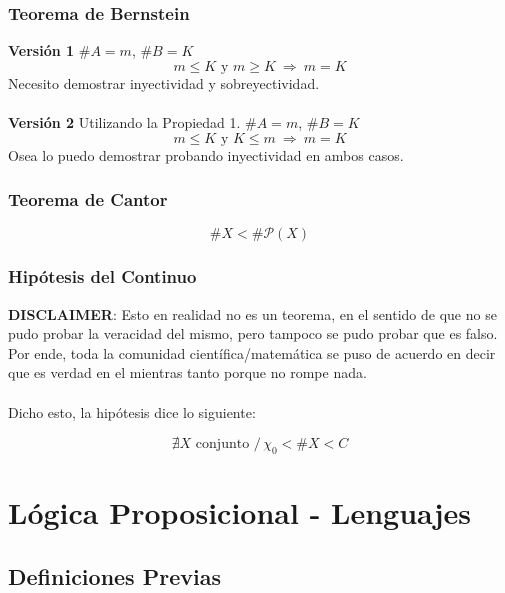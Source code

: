 \documentclass{article}
\newcommand{\tq}{/\,}                                   %
\newcommand{\partes}{\mathcal{P}}
\newcommand{\Rightarrows}{\: \Rightarrow \:}            %
\begin{document}
\subsubsection{Teorema de Bernstein}
\textbf{Versión 1}
$\#A = m$, $\#B = K$
\begin{equation*}
    m \leq K \text{ y } m \geq K \Rightarrows m = K
\end{equation*}
Necesito demostrar inyectividad y sobreyectividad.
\\\\
\textbf{Versión 2}
\newline Utilizando la Propiedad 1.
\newline $\#A = m$, $\#B = K$
\begin{equation*}
    m \leq K \text{ y } K \leq m \Rightarrows m = K
\end{equation*}
Osea lo puedo demostrar probando inyectividad en ambos casos.

\subsubsection{Teorema de Cantor}
\begin{equation*}
    \#X < \#\partes(X)
\end{equation*}

\subsubsection{Hipótesis del Continuo}
\textbf{DISCLAIMER}: Esto en realidad no es un teorema, en el sentido de que no se pudo probar la veracidad del mismo, pero tampoco se pudo probar que es falso. Por ende, toda la comunidad científica/matemática se puso de acuerdo en decir que es verdad en el mientras tanto porque no rompe nada.
\\\\Dicho esto, la hipótesis dice lo siguiente:

\begin{equation*}
    \nexists X \text{ conjunto } \tq \chi_0 < \#X < C
\end{equation*} 

\newpage
\section{Lógica Proposicional - Lenguajes}
\subsection{Definiciones Previas}
\end{document}
